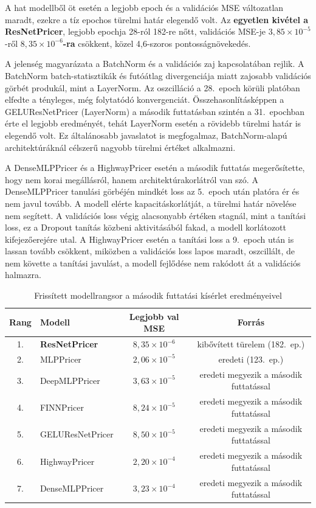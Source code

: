 A hat modellből öt esetén a legjobb epoch és a validációs MSE változatlan maradt, ezekre a tíz epochos türelmi határ elegendő volt. Az \textbf{egyetlen kivétel a ResNetPricer}, legjobb epochja 28-ról 182-re nőtt, validációs MSE-je $3{,}85 \times 10^{-5}$-ről \textbf{$8{,}35 \times 10^{-6}$-ra} csökkent, közel 4{,}6-szoros pontosságnövekedés.

A jelenség magyarázata a BatchNorm és a validációs zaj kapcsolatában rejlik. A BatchNorm batch-statisztikák és futóátlag divergenciája miatt zajosabb validációs görbét produkál, mint a LayerNorm. Az oszcilláció a 28.\ epoch körüli platóban elfedte a tényleges, még folytatódó konvergenciát. Összehasonlításképpen a GELUResNetPricer (LayerNorm) a második futtatásban szintén a 31.\ epochban érte el legjobb eredményét, tehát LayerNorm esetén a rövidebb türelmi határ is elegendő volt. Ez általánosabb javaslatot is megfogalmaz, BatchNorm-alapú architektúráknál célszerű nagyobb türelmi értéket alkalmazni.

A DenseMLPPricer és a HighwayPricer esetén a második futtatás megerősítette, hogy nem korai megállásról, hanem architektúrakorlátról van szó. A DenseMLPPricer tanulási görbéjén mindkét loss az 5.\ epoch után platóra ér és nem javul tovább. A modell elérte kapacitáskorlátját, a türelmi határ növelése nem segített. A validációs loss végig alacsonyabb értéken stagnál, mint a tanítási loss, ez a Dropout tanítás közbeni aktivitásából fakad, a modell korlátozott kifejezőerejére utal. A HighwayPricer esetén a tanítási loss a 9.\ epoch után is lassan tovább csökkent, miközben a validációs loss lapos maradt, oszcillált, de nem követte a tanítási javulást, a modell fejlődése nem rakódott át a validációs halmazra.

\begin{table}[H]
\centering
\caption{Frissített modellrangsor a második futtatási kísérlet eredményeivel}
\label{tab:finalranking}
\renewcommand{\arraystretch}{1.15}
\begin{tabular}{clcc}
\toprule
Rang & Modell & Legjobb val MSE & Forrás \\
\midrule
1. & \textbf{ResNetPricer}  & $8{,}35 \times 10^{-6}$ & kibővített türelem (182.\ ep.) \\
2. & MLPPricer              & $2{,}06 \times 10^{-5}$ & eredeti (123.\ ep.) \\
3. & DeepMLPPricer          & $3{,}63 \times 10^{-5}$ & eredeti megyezik a második futtatással \\
4. & FINNPricer             & $8{,}24 \times 10^{-5}$ & eredeti megyezik a második futtatással \\
5. & GELUResNetPricer       & $8{,}50 \times 10^{-5}$ & eredeti megyezik a második futtatással \\
6. & HighwayPricer          & $2{,}20 \times 10^{-4}$ & eredeti megyezik a második futtatással \\
7. & DenseMLPPricer         & $3{,}23 \times 10^{-4}$ & eredeti megyezik a második futtatással \\
\bottomrule
\end{tabular}
\end{table}


